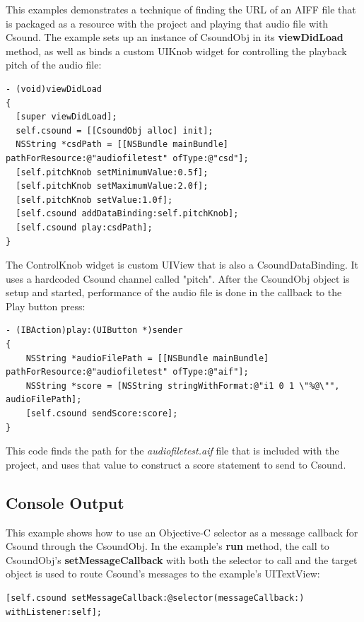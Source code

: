 \documentclass[11pt]{article}
\begin{document}
This examples demonstrates a technique of finding the URL of an AIFF file that is packaged as a resource with the project and playing that audio file with Csound.  The example sets up an instance of CsoundObj in its \textbf{viewDidLoad} method, as well as binds a custom UIKnob widget for controlling the playback pitch of the audio file:

\begin{lstlisting}[caption=CsoundObj setup code]
- (void)viewDidLoad
{
  [super viewDidLoad];
  self.csound = [[CsoundObj alloc] init];
  NSString *csdPath = [[NSBundle mainBundle] pathForResource:@"audiofiletest" ofType:@"csd"];
  [self.pitchKnob setMinimumValue:0.5f];
  [self.pitchKnob setMaximumValue:2.0f];
  [self.pitchKnob setValue:1.0f];
  [self.csound addDataBinding:self.pitchKnob];
  [self.csound play:csdPath];
}
\end{lstlisting}

The ControlKnob widget is custom UIView that is also a CsoundDataBinding.  It uses a hardcoded Csound channel called "pitch".  After the CsoundObj object is setup and started, performance of the audio file is done in the callback to the Play button press:

\begin{lstlisting}[caption=Play button callback code]
- (IBAction)play:(UIButton *)sender
{
    NSString *audioFilePath = [[NSBundle mainBundle] pathForResource:@"audiofiletest" ofType:@"aif"];
    NSString *score = [NSString stringWithFormat:@"i1 0 1 \"%@\"", audioFilePath];
    [self.csound sendScore:score];
}
\end{lstlisting}

This code finds the path for the \emph{audiofiletest.aif} file that is included with the project, and uses that value to construct a score statement to send to Csound.

\subsection{Console Output}

This example shows how to use an Objective-C selector as a message callback for Csound through the CsoundObj.  In the example's \textbf{run} method, the call to CsoundObj's \textbf{setMessageCallback} with both the selector to call and the target object is used to route Csound's messages to the example's UITextView:

\begin{lstlisting}[caption=Example of setting message callback]
    [self.csound setMessageCallback:@selector(messageCallback:) withListener:self];
\end{lstlisting}
\end{document}
